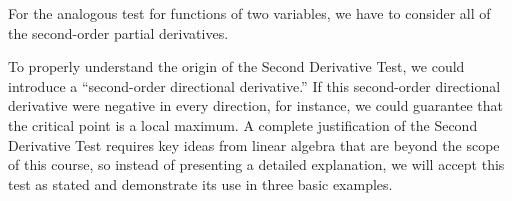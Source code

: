 For the analogous test for functions of two variables, we have to consider all of the second-order partial derivatives.
  
\vspace*{5pt}
\nin {}
\vspace*{5pt}

To properly understand the origin of the Second Derivative Test, we
could introduce a ``second-order directional derivative.''  If this
second-order directional derivative were negative in every direction, for
instance, we could guarantee that the critical point is a local
maximum.  A complete justification of the Second Derivative Test requires key ideas from linear algebra that are beyond the scope of this course, so instead of presenting a detailed
explanation, we will accept this test as stated and demonstrate its use in three basic examples. 

